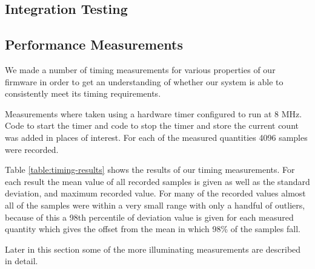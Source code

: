 \subsection{Integration Testing}

\subsection{Performance Measurements}

We made a number of timing measurements for various properties of our firmware
in order to get an understanding of whether our system is able to consistently
meet its timing requirements.

Measurements where taken using a hardware timer configured to run at 8 MHz. Code
to start the timer and code to stop the timer and store the current count was
added in places of interest. For each of the measured quantities 4096 samples
were recorded.

Table \ref{table:timing-results} shows the results of our timing measurements.
For each result the mean value of all recorded samples is given as well as the
standard deviation, and maximum recorded value. For many of the recorded values
almost all of the samples were within a very small range with only a handful
of outliers, because of this a 98th percentile of deviation value is given for
each measured quantity which gives the offset from the mean in which 98\% of the
samples fall.

Later in this section some of the more illuminating measurements are described
in detail.

